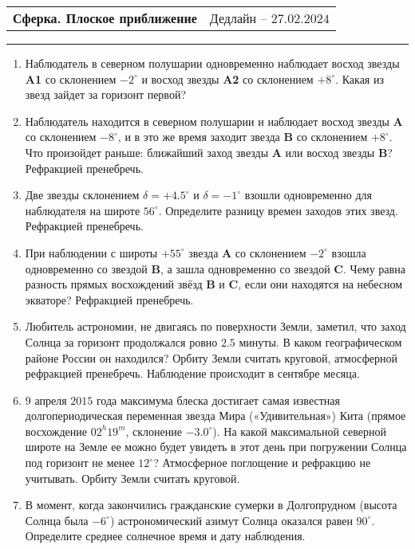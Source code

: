 \documentclass[12pt]{article}
\begin{document}
 \begin{tabularx}{\textwidth}{Xr}
  {\Large \textbf{Сферка. Плоское приближение}} & Дедлайн -- $27.02.2024$ \\
 \end{tabularx}
 \noindent\rule{\textwidth}{0.4pt}
 \begin{enumerate}
        \item Наблюдатель в северном полушарии одновременно наблюдает восход звезды \textbf{A1} со склонением $-2^{\circ}$ и восход звезды \textbf{A2} со склонением $+8^{\circ}$. Какая из звезд зайдет за горизонт первой?
        \item Наблюдатель находится в северном полушарии и наблюдает восход звезды \textbf{A} со склонением $-8^{\circ}$, и в это же время заходит звезда \textbf{B} со склонением $+8^{\circ}$. Что произойдет раньше: ближайший заход звезды \textbf{A} или восход звезды \textbf{B}? Рефракцией пренебречь.
        \item Две звезды склонением $\delta=+4.5^{\circ}$ и $\delta=-1^{\circ}$ взошли одновременно для наблюдателя на широте $56^{\circ}$. Определите разницу времен заходов этих звезд. Рефракцией пренебречь.
        \item При наблюдении с широты $+55^{\circ}$ звезда \textbf{A} со склонением $-2^{\circ}$ взошла одновременно со звездой \textbf{B}, а зашла одновременно со звездой \textbf{C}. Чему равна разность прямых восхождений звёзд \textbf{B} и \textbf{C}, если они находятся на небесном экваторе? Рефракцией пренебречь. 
        \item Любитель астрономии, не двигаясь по поверхности Земли, заметил, что заход	Солнца за горизонт продолжался ровно $2.5$ минуты. В каком географическом районе России он находился? Орбиту Земли считать круговой, атмосферной рефракцией пренебречь. Наблюдение происходит в сентябре месяца.
        \item $9$ апреля $2015$ года максимума блеска достигает самая известная долгопериодическая переменная звезда Мира («Удивительная») Кита (прямое восхождение $02^h 19^m$, склонение $-3.0^{\circ}$). На какой максимальной северной широте на Земле ее можно будет увидеть в этот день при погружении Солнца под горизонт не менее $12^{\circ}$? Атмосферное поглощение и рефракцию не учитывать. Орбиту Земли считать круговой.
        \item В момент, когда закончились гражданские сумерки в Долгопрудном (высота Солнца была $-6^{\circ}$) астрономический азимут Солнца оказался равен $90^{\circ}$. Определите среднее солнечное время и дату наблюдения.

\end{enumerate}
\end{document}
